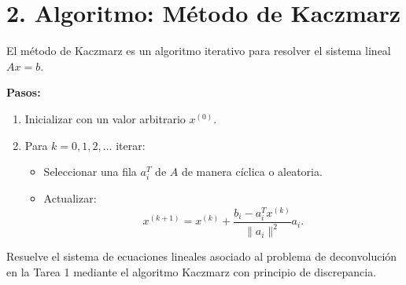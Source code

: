 \documentclass[12pt,spanish,mexico]{article}
\numberwithin{equation}{section}
\theoremstyle{definition}
\theoremstyle{remark}
\begin{document}
\section*{2. Algoritmo: Método de Kaczmarz}

El método de Kaczmarz es un algoritmo iterativo para resolver el sistema lineal \( Ax = b \).

\textbf{Pasos:}
\begin{enumerate}
    \item[(a)] Inicializar con un valor arbitrario \( x^{(0)} \).
    \item[(b)] Para \( k = 0, 1, 2, \ldots \) iterar:
    \begin{itemize}
        \item Seleccionar una fila \( a_i^T \) de \( A \) de manera cíclica o aleatoria.
        \item Actualizar:
        \[
        x^{(k+1)} = x^{(k)} + \frac{b_i - a_i^T x^{(k)}}{\|a_i\|^2} a_i. \tag{2}
        \]
    \end{itemize}
\end{enumerate}

Resuelve el sistema de ecuaciones lineales asociado al problema de deconvolución en la Tarea 1 mediante el algoritmo Kaczmarz con principio de discrepancia.
\end{document}
